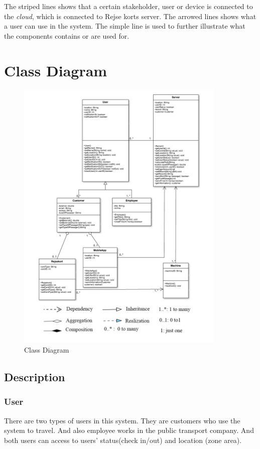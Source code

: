 The striped lines shows that a certain stakeholder, user or device is connected to the \textit{cloud}, which is connected to Rejse korts server.
The arrowed lines shows what a user can use in the system.
The simple line is used to further illustrate what the components contains or are used for.



\section*{Class Diagram}

\begin{figure}[ht!]
\centering
\includegraphics[width=100mm]{graphics/classdiagram.jpg}
\caption{Class Diagram}
\label{overflow}
\end{figure}

\subsection*{Description}

\subsubsection{User}
There are two types of users in this system. They are customers who use the system to travel. And also employee works in the public transport company. And both users can access to users’ status(check in/out) and location (zone area).

